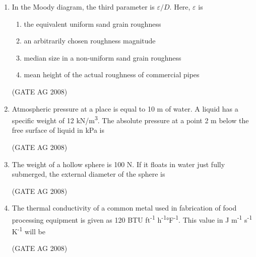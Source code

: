 \documentclass[journal,12pt,onecolumn]{IEEEtran}
\begin{document}
\begin{enumerate}
\medskip

\item 
 In the Moody diagram, the third parameter is $\varepsilon/D$. Here, $\varepsilon$ is
\begin{enumerate}
\item the equivalent uniform sand grain roughness
\item an arbitrarily chosen roughness magnitude
\item median size in a non-uniform sand grain roughness
\item mean height of the actual roughness of commercial pipes
\end{enumerate}
\hfill(GATE AG 2008)\\

\medskip

\item 
 Atmospheric pressure at a place is equal to 10 m of water. A liquid has a specific weight of 12 kN/m\textsuperscript{3}. The absolute pressure at a point 2 m below the free surface of liquid in kPa is
\begin{enumerate}
\end{enumerate}
\hfill(GATE AG 2008)\\

\medskip

\item 
 The weight of a hollow sphere is 100 N. If it floats in water just fully submerged, the external diameter of the sphere is
\begin{enumerate}
\end{enumerate}
\hfill(GATE AG 2008)\\

\medskip

\item 
 The thermal conductivity of a common metal used in fabrication of food processing equipment is given as 120 BTU ft\textsuperscript{-1} h\textsuperscript{-1}°F\textsuperscript{-1}. This value in J m\textsuperscript{-1} s\textsuperscript{-1} K\textsuperscript{-1} will be
\begin{enumerate}
\end{enumerate}
\hfill(GATE AG 2008)\\


\end{enumerate}
\end{document}
